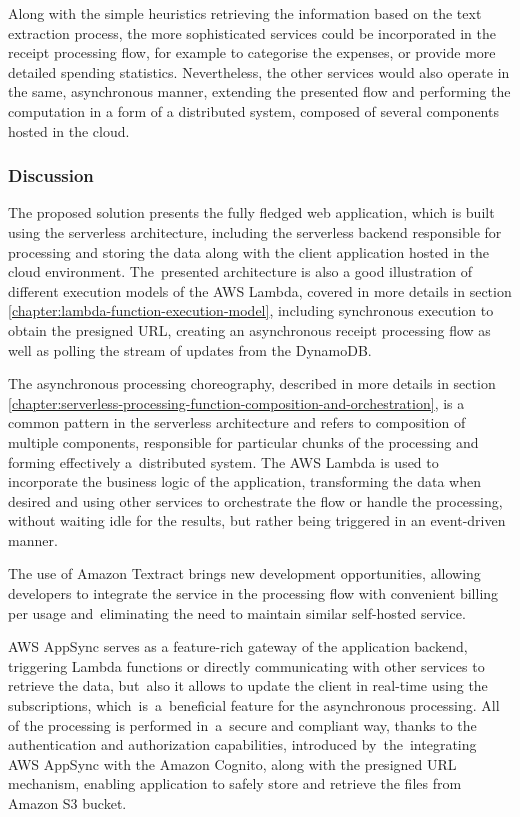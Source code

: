 Along with the simple heuristics retrieving the information based on the text extraction process, the more sophisticated services could be incorporated in the receipt processing flow, for example to categorise the expenses, or provide more detailed spending statistics. Nevertheless, the other services would also operate in the same, asynchronous manner, extending the presented flow and performing the computation in a form of a distributed system, composed of several components hosted in the cloud.

\subsubsection{Discussion}

The proposed solution presents the fully fledged web application, which is built using the serverless architecture, including the serverless backend responsible for processing and storing the data along with the client application hosted in the cloud environment.
The~presented architecture is also a good illustration of different execution models of the AWS Lambda, covered in more details in section \ref{chapter:lambda-function-execution-model}, including synchronous execution to obtain the presigned URL, creating an asynchronous receipt processing flow as well as polling the stream of updates from the DynamoDB.

The asynchronous processing choreography, described in more details in section \ref{chapter:serverless-processing-function-composition-and-orchestration}, is a common pattern in the serverless architecture and refers to composition of multiple components, responsible for particular chunks of the processing and forming effectively a~distributed system.
The AWS Lambda is used to incorporate the business logic of the application, transforming the data when desired and using other services to orchestrate the flow or handle the processing, without waiting idle for the results, but rather being triggered in an event-driven manner.

The use of Amazon Textract brings new development opportunities, allowing developers to integrate the service in the processing flow with convenient billing per usage and~eliminating the need to maintain similar self-hosted service.

AWS AppSync serves as a feature-rich gateway of the application backend, triggering Lambda functions or directly communicating with other services to retrieve the data, but~also it allows to update the client in real-time using the subscriptions, which~is~a~beneficial feature for the asynchronous processing.
All of the processing is performed in~a~secure and compliant way, thanks to the authentication and authorization capabilities, introduced by~the~integrating AWS AppSync with the Amazon Cognito, along with the presigned URL mechanism, enabling application to safely store and retrieve the files from Amazon S3 bucket.

